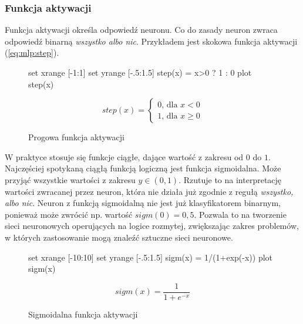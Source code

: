 \documentclass[a4paper,12pt,twoside,openany]{report}
\newcommand{\Eq}[1]{(\ref{#1})}
\begin{document}
\subsubsection{Funkcja aktywacji}
Funkcja aktywacji określa odpowiedź neuronu.
Co do zasady neuron zwraca odpowiedź binarną \textit{wszystko albo nic}.
Przykładem jest skokowa funkcja aktywacji \Eq{eq:mlp:step}.
\begin{figure}[h]
	\label{wyk:mlp:step}
	\centering
	\begin{gnuplot}[terminal=pdf,terminaloptions=color]
		set xrange [-1:1] 
		set yrange [-.5:1.5]
		step(x) = x>0 ? 1 : 0
		plot step(x)
	\end{gnuplot}
	\begin{equation}
		step(x)={\begin{cases}0{\text{, dla }}x<0\\1{\text{, dla }}x\geq 0\end{cases}}
	\end{equation}
	\caption{Progowa funkcja aktywacji}
\end{figure}

W praktyce stosuje się funkcje ciągłe, dające wartość z zakresu od $0$ do $1$.
Najczęściej spotykaną ciągłą funkcją logiczną jest funkcja sigmoidalna.
Może przyjąć wszystkie wartości z zakresu $y \in (0,1)$.
Rzutuje to na interpretację wartości zwracanej przez neuron,
która nie działa już zgodnie z regułą \textit{wszystko, albo nic}.
Neuron z funkcją sigmoidalną nie jest już klasyfikatorem binarnym, ponieważ może zwrócić np. wartość $sigm(0) = 0,5$.
Pozwala to na tworzenie sieci neuronowych operujących na logice rozmytej,
zwiększając zakres problemów, w których zastosowanie mogą znaleźć sztuczne sieci neuronowe.


\begin{figure}[h]
	\label{wyk:mlp:sigm}
	\centering
	\begin{gnuplot}[terminal=pdf,terminaloptions=color]
		set xrange [-10:10] 
		set yrange [-.5:1.5]
		sigm(x) = 1/(1+exp(-x))
		plot sigm(x)
	\end{gnuplot}
	\begin{equation}
		sigm(x)=\frac{1}{1+e^{-x}}
	\end{equation}
	\caption{Sigmoidalna funkcja aktywacji}
\end{figure}
\end{document}
